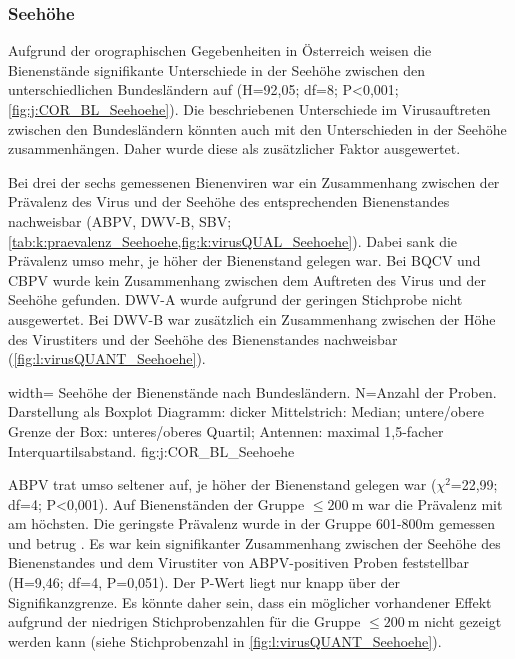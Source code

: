  
 
 
 \subsubsection{Seehöhe}
 
 Aufgrund der orographischen Gegebenheiten in Österreich weisen die Bienenstände signifikante Unterschiede in der Seehöhe zwischen den unterschiedlichen Bundesländern auf (H=92,05; df=8; P<0,001; \cref{fig:j:COR_BL_Seehoehe}). Die beschriebenen Unterschiede im Virusauftreten zwischen den Bundesländern könnten auch mit den Unterschieden in der Seehöhe zusammenhängen. Daher wurde diese als zusätzlicher Faktor ausgewertet.
 
 Bei drei der sechs gemessenen Bienenviren war ein Zusammenhang zwischen der Prävalenz des Virus und der Seehöhe des entsprechenden Bienenstandes nachweisbar (ABPV, DWV-B, SBV; \cref{tab:k:praevalenz_Seehoehe,fig:k:virusQUAL_Seehoehe}). Dabei sank die Prävalenz umso mehr, je höher der Bienenstand gelegen war. Bei BQCV und CBPV wurde kein Zusammenhang zwischen dem Auftreten des Virus und der Seehöhe gefunden. DWV-A wurde aufgrund der geringen Stichprobe nicht ausgewertet. Bei DWV-B war zusätzlich ein Zusammenhang zwischen der Höhe des Virustiters und der Seehöhe des Bienenstandes nachweisbar (\cref{fig:l:virusQUANT_Seehoehe}).
 
  {width=\textwidth} %
  {Seehöhe der Bienenstände nach Bundesländern. N=Anzahl der Proben. Darstellung als Boxplot Diagramm: dicker Mittelstrich: Median; untere/obere Grenze der Box: unteres/oberes Quartil; Antennen: maximal 1,5-facher Interquartilsabstand.} %
  {}%
  {fig:j:COR_BL_Seehoehe} %
 
 ABPV trat umso seltener auf, je höher der Bienenstand gelegen war ($\chi^2$=22,99; df=4; P<0,001). Auf Bienenständen der Gruppe $\leq \SI{200}{\meter}$ war die Prävalenz mit  am höchsten. Die geringste Prävalenz wurde in der Gruppe 601-800\si{\meter} gemessen und betrug . Es war kein signifikanter Zusammenhang zwischen der Seehöhe des Bienenstandes und dem Virustiter von ABPV-positiven Proben feststellbar (H=9,46; df=4, P=0,051). Der P-Wert liegt nur knapp über der Signifikanzgrenze. Es könnte daher sein, dass ein möglicher vorhandener Effekt aufgrund der niedrigen Stichprobenzahlen für die Gruppe $\leq \SI{200}{\meter}$ nicht gezeigt werden kann (siehe Stichprobenzahl in \cref{fig:l:virusQUANT_Seehoehe}).

